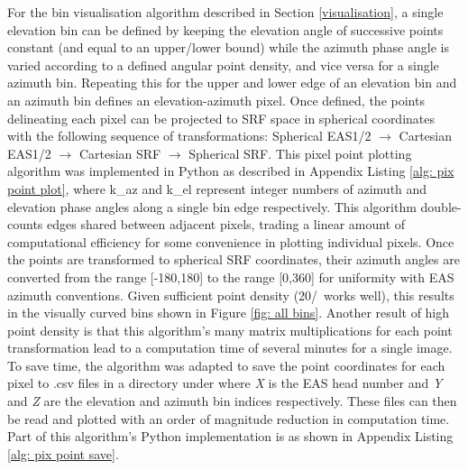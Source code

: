 \bgroup\obeylines



\egroup

For the bin visualisation algorithm described in Section \ref{visualisation}, a single elevation bin can be defined by keeping the elevation angle of successive points constant (and equal to an upper/lower bound) while the azimuth phase angle is varied according to a defined angular point density, and vice versa for a single azimuth bin. Repeating this for the upper and lower edge of an elevation bin and an azimuth bin defines an elevation-azimuth pixel. Once defined, the points delineating each pixel can be projected to SRF space in spherical coordinates with the following sequence of transformations: Spherical EAS1/2 \(\rightarrow\) Cartesian EAS1/2 \(\rightarrow\) Cartesian SRF \(\rightarrow\) Spherical SRF. This pixel point plotting algorithm was implemented in Python as described in Appendix Listing \ref{alg: pix point plot}, where k\_az and k\_el represent integer numbers of azimuth and elevation phase angles along a single bin edge respectively. This algorithm double-counts edges shared between adjacent pixels, trading a linear amount of computational efficiency for some convenience in plotting individual pixels. Once the points are transformed to spherical SRF coordinates, their azimuth angles are converted from the range [-180,180] to the range [0,360] for uniformity with EAS azimuth conventions. Given sufficient point density (20/\degree\ works well), this results in the visually curved bins shown in Figure \ref{fig: all bins}. Another result of high point density is that this algorithm's many matrix multiplications for each point transformation lead to a computation time of several minutes for a single image. To save time, the algorithm was adapted to save the point coordinates for each pixel to .csv files in a directory under  where \textit{X} is the EAS head number and \textit{Y} and \textit{Z} are the elevation and azimuth bin indices respectively. These files can then be read and plotted with an order of magnitude reduction in computation time. Part of this algorithm's Python implementation is as shown in Appendix Listing \ref{alg: pix point save}.
\\

